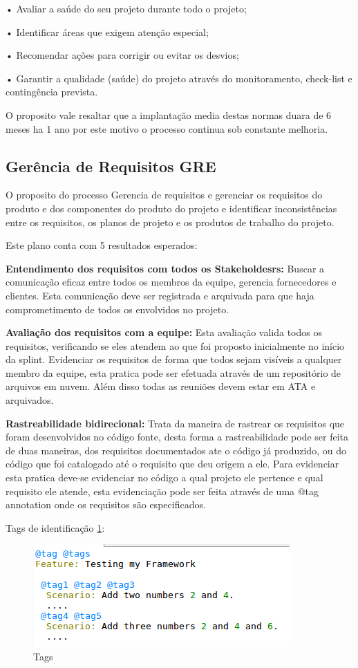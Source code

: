 \documentclass[	DIV=calc,%
							paper=a4,%
							fontsize=12pt,%
							onecolumn]{scrartcl}	 					%
\begin{document}
•	Avaliar a saúde do seu projeto durante todo o projeto;

•	Identificar áreas que exigem atenção especial;

•	Recomendar ações para corrigir ou evitar os desvios;

•	Garantir a qualidade (saúde) do projeto através do monitoramento, check-list e contingência prevista.

O proposito vale resaltar que a implantação media destas normas duara de 6 meses ha 1 ano por este motivo o processo continua sob constante melhoria.

\subsection{Gerência de Requisitos GRE}

O proposito do processo Gerencia de requisitos e gerenciar os requisitos do produto e dos componentes do produto do projeto e identificar inconsistências entre os requisitos, os planos de projeto e os produtos de trabalho do projeto.


Este plano conta com 5 resultados esperados:


{\textbf{Entendimento dos requisitos com todos os Stakeholdesrs:}} Buscar a comunicação eficaz entre todos os membros da equipe, gerencia fornecedores e clientes. Esta comunicação deve ser registrada e arquivada para que haja comprometimento de todos os envolvidos no projeto.


{\textbf{Avaliação dos requisitos com a equipe:}}  Esta avaliação valida todos os requisitos, verificando se eles atendem ao que foi proposto inicialmente no início da splint. Evidenciar os requisitos de forma que todos sejam visíveis a qualquer membro da equipe, esta pratica pode ser efetuada através de um repositório de arquivos em nuvem. Além disso todas as reuniões devem estar em ATA e arquivados. 


{\textbf{Rastreabilidade bidirecional:}}  Trata da maneira de rastrear os requisitos que foram desenvolvidos no código fonte, desta forma a rastreabilidade pode ser feita de duas maneiras, dos requisitos documentados ate o código já produzido, ou do código que foi catalogado até o requisito que deu origem a ele. Para evidenciar esta pratica deve-se evidenciar no código a qual projeto ele pertence e qual requisito ele atende, esta evidenciação pode ser feita através de uma @tag annotation onde os requisitos são especificados.

Tags de identificação \ref{rup6}: 
 \begin{figure}[h!]
    \centering
	\includegraphics[]{tag.png}
	\caption{Tags}
	\label{rup6}
\end{figure}
\end{document}
